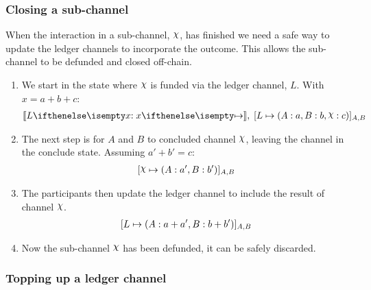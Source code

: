 \documentclass{article}
\begin{document}
\subsubsection{Closing a sub-channel}

When the interaction in a sub-channel, $\rchi$, has finished we need a safe way to update the ledger channels to incorporate the outcome.
This allows the sub-channel to be defunded and closed off-chain.
\begin{enumerate}
  \item We start in the state where $\rchi$ is funded via the ledger channel, $L$. With $x = a + b + c$:
  \begin{align}
    \adj{\holds{L}{x}{}}, \; \finalizable{L}{\alloc{A: a, B: b, \rchi: c}}{A, B}
  \end{align}
  \item The next step is for $A$ and $B$ to concluded channel $\rchi$, leaving the channel in the conclude state. Assuming $a' + b' = c$:
  \begin{align}
    \finalizable{\rchi}{\alloc{A:a', B:b'}}{A,B}
  \end{align}
  \item The participants then update the ledger channel to include the result of channel $\rchi$.
  \begin{align}
    [L \mapsto ( A: a+ a', B: b + b' )]_{A, B}
  \end{align}
  \item Now the sub-channel $\rchi$ has been defunded, it can be safely discarded.
\end{enumerate}

\subsubsection{Topping up a ledger channel}
\end{document}
